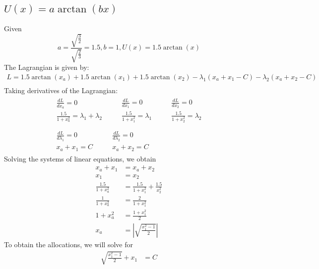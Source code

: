 \documentclass[]{article}
\newcommand{\e}{&=}
\begin{document}
\subsection{$U(x)=a\arctan(bx)$}

Given 
\[
	a = \frac{\sqrt{\frac{3}{2}}}{\sqrt{\frac{2}{3}}} = 1.5, b = 1, U(x) = 1.5 \arctan(x)
\]
The Lagrangian is given by:
\begin{gather*}
L = 1.5\arctan(x_a) + 1.5\arctan(x_1) + 1.5\arctan(x_2) - \lambda_1(x_a + x_1 - C) - \lambda_2(x_a + x_2 - C) \\
\end{gather*}
Taking derivatives of the Lagrangian:
\begin{gather*}
\begin{split}
\frac{dL}{dx_a} = 0 \\
\frac{1.5}{1 + x_a^2} = \lambda_1 + \lambda_2
\end{split} \qquad 
\begin{split}
\frac{dL}{dx_1} = 0 \\
\frac{1.5}{1 + x_1^2} = \lambda_1
\end{split} \qquad
\begin{split}
\frac{dL}{dx_2} = 0 \\
\frac{1.5}{1 + x_2^2} = \lambda_2
\end{split} \\\\
\begin{split}
\frac{dL}{d\lambda_1} = 0 \\
x_a + x_1 = C
\end{split} \qquad
\begin{split}
\frac{dL}{d\lambda_2} = 0 \\
x_a + x_2 = C
\end{split}
\end{gather*}
Solving the systems of linear equations, we obtain
\begin{align*}
x_a + x_1 \e x_a + x_2 \\
x_1 \e x_2 \\
\frac{1.5}{1 + x_a^2} \e \frac{1.5}{1 + x_1^2} + \frac{1.5}{x_2^2} \\
\frac{1}{1 + x_a^2} \e \frac{2}{1 + x_1^2} \\
1 + x_a^2 \e \frac{1 + x_1^2}{2} \\
x_a \e \left| \sqrt{\frac{x_1^2 - 1}{2}} \right|
\end{align*}
To obtain the allocations, we will solve for
\begin{align*}
\sqrt{\frac{x_1^2 - 1}{2}} + x_1 \e C
\end{align*}
\end{document}
